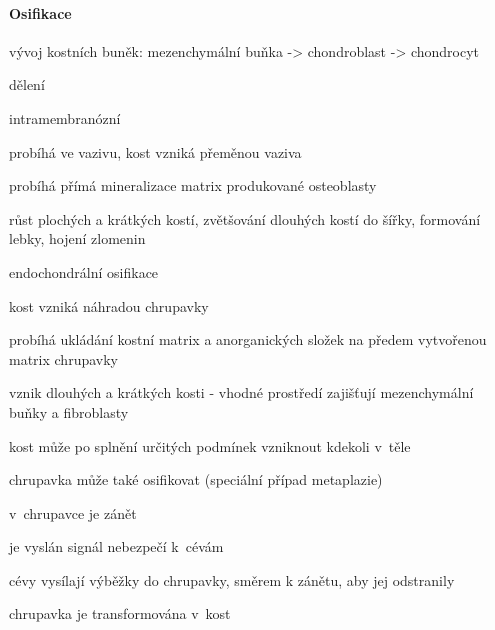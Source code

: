 \documentclass[DIV=8]{scrreprt}
\begin{document}
\paragraph{Osifikace}
\begin{myItemize}[nosep]
    \item vývoj kostních buněk: mezenchymální buňka -> chondroblast -> chondrocyt
    \item dělení
\begin{myItemize}[nosep]
    \item intramembranózní
\begin{myItemize}[nosep]
    \item probíhá ve vazivu, kost vzniká přeměnou vaziva
\begin{myItemize}[nosep]
    \item probíhá přímá mineralizace matrix produkované osteoblasty
\end{myItemize}

    \item růst plochých a krátkých kostí, zvětšování dlouhých kostí do šířky, formování lebky, hojení zlomenin
\end{myItemize}

    \item endochondrální osifikace
\begin{myItemize}[nosep]
    \item kost vzniká náhradou chrupavky
\begin{myItemize}[nosep]
    \item probíhá ukládání kostní matrix a anorganických složek na předem vytvořenou matrix chrupavky
\end{myItemize}

    \item vznik dlouhých a krátkých kosti
 - vhodné prostředí zajišťují mezenchymální buňky a fibroblasty
\end{myItemize}

\end{myItemize}

    \item kost může po splnění určitých podmínek vzniknout kdekoli v těle
    \item chrupavka může také osifikovat (speciální případ metaplazie)
\begin{myEnumerate}[nosep]
    \item v chrupavce je zánět
    \item je vyslán signál nebezpečí k cévám
    \item cévy vysílají výběžky do chrupavky, směrem k zánětu, aby jej odstranily
    \item chrupavka je transformována v kost
\end{myEnumerate}

\end{myItemize}
\end{document}
